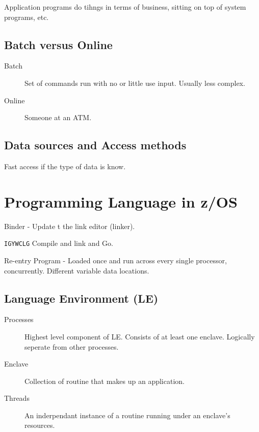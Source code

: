 \documentclass{report}
\begin{document}
Application programs do tihngs in terms of business, sitting on top of system programs, etc.

\subsection{Batch versus Online}

\begin{description}
\item[Batch] Set of commands run with no or little use input. Usually less complex.
\item[Online] Someone at an ATM.
\end{description}

\subsection{Data sources and Access methods}
Fast access if the type of data is know.

\section{Programming Language in z/OS}

Binder - Update t the link editor (linker).

\verb+IGYWCLG+ Compile and link and Go.

Re-entry Program - Loaded once and run across every single processor, concurrently. Different variable data locations.

\subsection{Language Environment (LE)}

\begin{description}
\item[Processes] Highest level component of LE. Consists of at least one enclave. Logically seperate from other processes.
\item[Enclave] Collection of routine that makes up an application.
\item[Threads] An inderpendant instance of a routine running under an enclave's resources.
\end{description}
\end{document}
